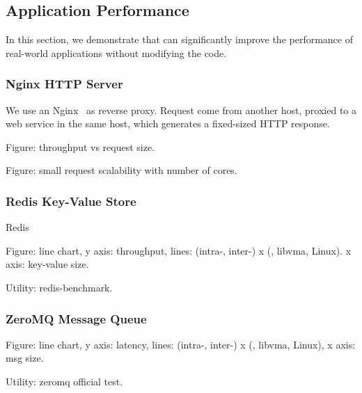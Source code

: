 \subsection{Application Performance}
\label{subsec:application}

In this section, we demonstrate that \sys{} can significantly improve the performance of real-world applications without modifying the code.

\subsubsection{Nginx HTTP Server}
\quad

We use an Nginx~\cite{nginx} as reverse proxy. Request come from another host, proxied to a web service in the same host, which generates a fixed-sized HTTP response.

Figure: throughput vs request size.

Figure: small request scalability with number of cores.

\subsubsection{Redis Key-Value Store}
\quad

Redis~\cite{redis}

Figure: line chart, y axis: throughput, lines: (intra-, inter-) x (\sys{}, libvma, Linux). x axis: key-value size.

Utility: redis-benchmark.





\subsubsection{ZeroMQ Message Queue}
\quad

Figure: line chart, y axis: latency, lines: (intra-, inter-) x (\sys{}, libvma, Linux), x axis: msg size.

Utility: zeromq official test.

